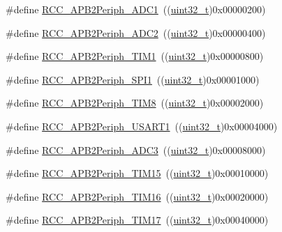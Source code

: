 \begin{DoxyCompactItemize}
\item 
\#define \hyperlink{group___a_p_b2__peripheral_gacd24acb2cd5ca208652157f6c13d3145}{R\+C\+C\+\_\+\+A\+P\+B2\+Periph\+\_\+\+A\+D\+C1}~((\hyperlink{_p_e___types_8h_a33594304e786b158f3fb30289278f5af}{uint32\+\_\+t})0x00000200)
\item 
\#define \hyperlink{group___a_p_b2__peripheral_ga4fd76e573e827702568d6064e33448b5}{R\+C\+C\+\_\+\+A\+P\+B2\+Periph\+\_\+\+A\+D\+C2}~((\hyperlink{_p_e___types_8h_a33594304e786b158f3fb30289278f5af}{uint32\+\_\+t})0x00000400)
\item 
\#define \hyperlink{group___a_p_b2__peripheral_ga0d9babf212897db0b3aa852f8a71160b}{R\+C\+C\+\_\+\+A\+P\+B2\+Periph\+\_\+\+T\+I\+M1}~((\hyperlink{_p_e___types_8h_a33594304e786b158f3fb30289278f5af}{uint32\+\_\+t})0x00000800)
\item 
\#define \hyperlink{group___a_p_b2__peripheral_ga289cc086580f4b6a080ea0ed3dd4a7af}{R\+C\+C\+\_\+\+A\+P\+B2\+Periph\+\_\+\+S\+P\+I1}~((\hyperlink{_p_e___types_8h_a33594304e786b158f3fb30289278f5af}{uint32\+\_\+t})0x00001000)
\item 
\#define \hyperlink{group___a_p_b2__peripheral_gac951d41a08140a7d38a4faff8dd1e03e}{R\+C\+C\+\_\+\+A\+P\+B2\+Periph\+\_\+\+T\+I\+M8}~((\hyperlink{_p_e___types_8h_a33594304e786b158f3fb30289278f5af}{uint32\+\_\+t})0x00002000)
\item 
\#define \hyperlink{group___a_p_b2__peripheral_ga14e1b3b6d84801c223a37a954b5b1910}{R\+C\+C\+\_\+\+A\+P\+B2\+Periph\+\_\+\+U\+S\+A\+R\+T1}~((\hyperlink{_p_e___types_8h_a33594304e786b158f3fb30289278f5af}{uint32\+\_\+t})0x00004000)
\item 
\#define \hyperlink{group___a_p_b2__peripheral_ga371d55bbf17bf965a213c59f2d276d72}{R\+C\+C\+\_\+\+A\+P\+B2\+Periph\+\_\+\+A\+D\+C3}~((\hyperlink{_p_e___types_8h_a33594304e786b158f3fb30289278f5af}{uint32\+\_\+t})0x00008000)
\item 
\#define \hyperlink{group___a_p_b2__peripheral_ga774f9082c3331890c06b9fd9deafe549}{R\+C\+C\+\_\+\+A\+P\+B2\+Periph\+\_\+\+T\+I\+M15}~((\hyperlink{_p_e___types_8h_a33594304e786b158f3fb30289278f5af}{uint32\+\_\+t})0x00010000)
\item 
\#define \hyperlink{group___a_p_b2__peripheral_ga739d0a5fe583f07f5b6fa320f2d2e53a}{R\+C\+C\+\_\+\+A\+P\+B2\+Periph\+\_\+\+T\+I\+M16}~((\hyperlink{_p_e___types_8h_a33594304e786b158f3fb30289278f5af}{uint32\+\_\+t})0x00020000)
\item 
\#define \hyperlink{group___a_p_b2__peripheral_ga5a6217b6200d6679dc7bee4522d6038a}{R\+C\+C\+\_\+\+A\+P\+B2\+Periph\+\_\+\+T\+I\+M17}~((\hyperlink{_p_e___types_8h_a33594304e786b158f3fb30289278f5af}{uint32\+\_\+t})0x00040000)

\end{DoxyCompactItemize}
